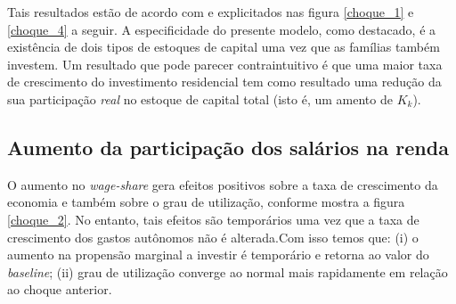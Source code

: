 

Tais resultados estão de acordo com \textcite{freitas_growth_2015} e explicitados nas figura \ref{choque_1} e \ref{choque_4} a seguir. A especificidade do presente modelo, como destacado, é a existência de dois tipos de estoques de capital uma vez que as famílias também investem. Um resultado que pode parecer contraintuitivo é que uma maior taxa de crescimento do investimento residencial tem como resultado uma redução  da sua participação \textit{real} no estoque de capital total (isto é, um amento de $K_k$). 

\subsection*{Aumento da participação dos salários na renda}

O aumento no \textit{wage-share} gera efeitos positivos sobre a taxa de crescimento da economia e também sobre o grau de utilização, conforme mostra a figura \ref{choque_2}. No entanto, tais efeitos são temporários uma vez que a taxa de crescimento dos gastos autônomos não é alterada.Com isso temos que: (i) o aumento na propensão marginal a investir é temporário e retorna ao valor do \textit{baseline}; (ii) grau de utilização converge ao normal mais rapidamente em relação ao choque anterior. 


